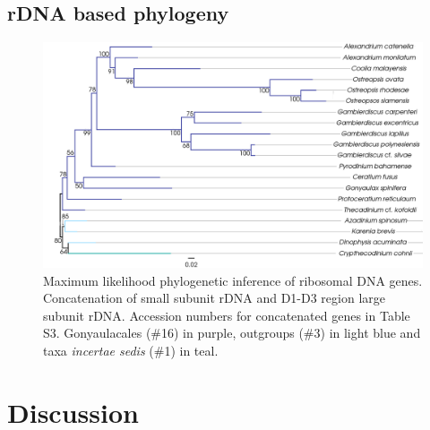 \documentclass[12pt]{article}
\begin{document}
\subsection*{rDNA based phylogeny}
\FloatBarrier 
\begin{figure} 
\includegraphics[scale=.23]{figures/rDNA-ML.png} 
\caption{Maximum likelihood phylogenetic inference of ribosomal DNA genes. Concatenation of small subunit rDNA and D1-D3 region large subunit rDNA. Accession numbers for concatenated genes in Table S3. Gonyaulacales (\#16) in purple, outgroups (\#3) in light blue and taxa \textit{incertae sedis} (\#1) in teal.} 
\label{fig:rdna}
\end{figure} 
\FloatBarrier


\newpage
\section{Discussion}
\end{document}
